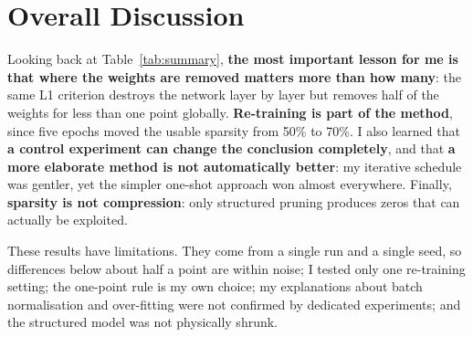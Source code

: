 \documentclass[11pt,a4paper]{article}
\begin{document}
\section{Overall Discussion}

\begin{table}[H]
\centering
\caption{Summary: highest sparsity of each method within one point of the baseline (validation), and its test accuracy when evaluated.}
\label{tab:summary}
\end{table}

Looking back at Table~\ref{tab:summary}, \textbf{the most important lesson for me is that where the weights are removed matters more than how many}: the same L1 criterion destroys the network layer by layer but removes half of the weights for less than one point globally. \textbf{Re-training is part of the method}, since five epochs moved the usable sparsity from 50\% to 70\%. I also learned that \textbf{a control experiment can change the conclusion completely}, and that \textbf{a more elaborate method is not automatically better}: my iterative schedule was gentler, yet the simpler one-shot approach won almost everywhere. Finally, \textbf{sparsity is not compression}: only structured pruning produces zeros that can actually be exploited.

These results have limitations. They come from a single run and a single seed, so differences below about half a point are within noise; I tested only one re-training setting; the one-point rule is my own choice; my explanations about batch normalisation and over-fitting were not confirmed by dedicated experiments; and the structured model was not physically shrunk.
\end{document}
